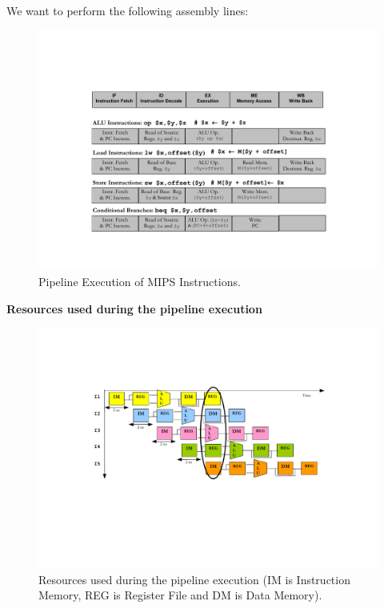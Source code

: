 \highspace
We want to perform the following assembly lines:

\begin{figure}[!htp]
    \centering
    \includegraphics[width=\textwidth]{img/sequential-vs-pipelining-2.pdf}
    \caption{Pipeline Execution of MIPS Instructions.\cite{pipelining-slides}}
\end{figure}

\newpage

\begin{center}
    \textcolor{Red3}{\textbf{Resources used during the pipeline execution}}
\end{center}
\begin{figure}[!htp]
    \centering
    \includegraphics[width=\textwidth]{img/sequential-vs-pipelining-3.pdf}
    \caption{Resources used during the pipeline execution (IM is Instruction Memory, REG is Register File and DM is Data Memory).\cite{pipelining-slides}}
\end{figure}

